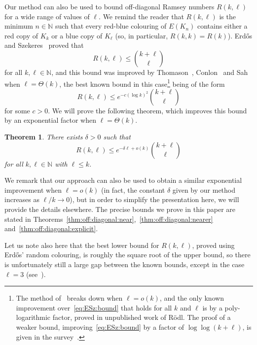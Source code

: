 \documentclass[12pt,reqno]{amsart}
\newtheorem{theorem}{Theorem}[section]
\theoremstyle{definition}
\theoremstyle{remark}
\newcommand\N{\mathbb{N}}
\renewcommand{\le}{\leqslant}
\renewcommand{\to}{\rightarrow}
\def\N{\mathbb{N}}
\begin{document}
Our method can also be used to bound off-diagonal Ramsey numbers $R(k,\ell)$ for a wide range of values of $\ell$. We remind the reader that $R(k,\ell)$ is the minimum $n \in \N$ such that every red-blue colouring of $E(K_n)$ contains either a red copy of $K_k$ or a blue copy of $K_\ell$ (so, in particular, $R(k,k) = R(k)$). Erd\H{o}s and Szekeres~\cite{ESz35} proved that 
\begin{equation}\label{eq:ESz:bound}
R(k,\ell) \le {k + \ell \choose \ell}
\end{equation}
for all $k,\ell \in \N$, and this bound was improved by Thomason~\cite{T88}, Conlon~\cite{C09} and Sah~\cite{S23} when $\ell = \Theta(k)$, the best known bound in this case\footnote{The method of~\cite{T88,C09,S23} breaks down when $\ell = o(k)$, and the only known improvement over~\eqref{eq:ESz:bound} that holds for all $k$ and $\ell$ is by a poly-logarithmic factor, proved in unpublished work of R\"odl. The proof of a weaker bound,  improving~\eqref{eq:ESz:bound} by a factor of $\log\log(k+\ell)$, is given in the survey~\cite{GR}.} being of the form
$$R(k,\ell) \le e^{- c(\log k)^2} {k + \ell \choose \ell}$$
for some $c > 0$. We will prove the following theorem, which improves this bound by an exponential factor when $\ell = \Theta(k)$. 

\begin{theorem}\label{thm:off:diagonal}
There exists $\delta > 0$ such that 
$$R(k,\ell) \le e^{-\delta \ell + o(k)} {k + \ell \choose \ell}$$
for all $k,\ell \in \N$ with $\ell \le k$. 
\end{theorem}

We remark that our approach can also be used to obtain a similar exponential improvement when $\ell = o(k)$ (in fact, the constant $\delta$ given by our method increases as $\ell/k \to 0$), but in order to simplify the presentation here, we will provide the details elsewhere. The precise bounds we prove in this paper are stated in Theorems~\ref{thm:off:diagonal:near},~\ref{thm:off:diagonal:nearer} and~\ref{thm:off:diagonal:explicit}. 


Let us note also here that the best lower bound for $R(k,\ell)$, proved using Erd\H{o}s' random colouring, is roughly the square root of the upper bound, so there is unfortunately still a large gap between the known bounds, except in the case $\ell = 3$ (see~\cite{AKSz,Boh,BK,Kim,FGM,Sh83}). 
\end{document}
